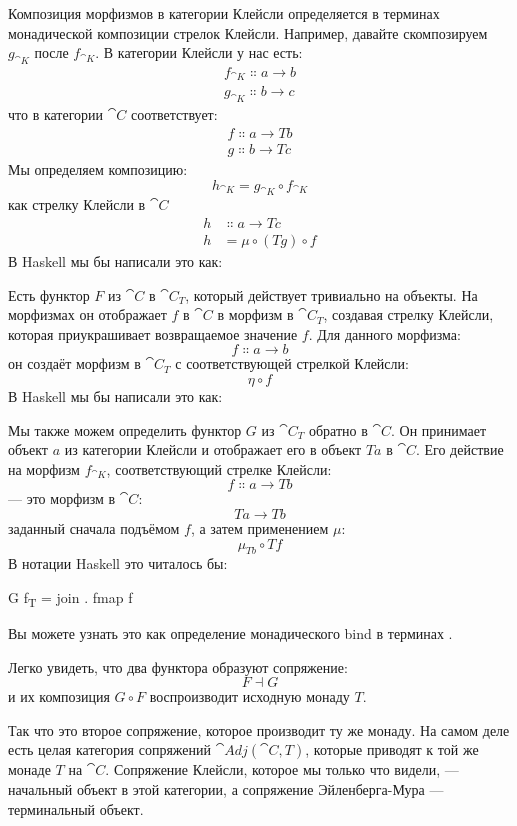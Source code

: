 Композиция морфизмов в категории Клейсли определяется в терминах
монадической композиции стрелок Клейсли. Например, давайте скомпозируем
$g_{\cat{K}}$ после $f_{\cat{K}}$. В категории Клейсли у нас есть:
\begin{gather*}
  f_{\cat{K}} \Colon a \to b \\
  g_{\cat{K}} \Colon b \to c
\end{gather*}
что в категории $\cat{C}$ соответствует:
\begin{gather*}
  f \Colon a \to T b \\
  g \Colon b \to T c
\end{gather*}
Мы определяем композицию:
\[h_{\cat{K}} = g_{\cat{K}} \circ f_{\cat{K}}\]
как стрелку Клейсли в $\cat{C}$
\begin{align*}
  h & \Colon a \to T c          \\
  h & = \mu \circ (T g) \circ f
\end{align*}
В Haskell мы бы написали это как:

Есть функтор $F$ из $\cat{C}$ в $\cat{C}_T$,
который действует тривиально на объекты. На морфизмах он отображает $f$ в
$\cat{C}$ в морфизм в $\cat{C}_T$, создавая
стрелку Клейсли, которая приукрашивает возвращаемое значение $f$. Для данного
морфизма:
\[f \Colon a \to b\]
он создаёт морфизм в $\cat{C}_T$ с
соответствующей стрелкой Клейсли:
\[\eta \circ f\]
В Haskell мы бы написали это как:

Мы также можем определить функтор $G$ из $\cat{C}_T$
обратно в $\cat{C}$. Он принимает объект $a$ из категории
Клейсли и отображает его в объект $T a$ в $\cat{C}$. Его действие
на морфизм $f_{\cat{K}}$, соответствующий стрелке Клейсли:
\[f \Colon a \to T b\]
--- это морфизм в $\cat{C}$:
\[T a \to T b\]
заданный сначала подъёмом $f$, а затем применением $\mu$:
\[\mu_{T b} \circ T f\]
В нотации Haskell это читалось бы:

\begin{snipv}
G f\textsubscript{T} = join . fmap f
\end{snipv}
Вы можете узнать это как определение монадического bind в терминах
.

Легко увидеть, что два функтора образуют сопряжение:
\[F \dashv G\]
и их композиция $G \circ F$ воспроизводит исходную монаду $T$.

Так что это второе сопряжение, которое производит ту же монаду. На самом деле
есть целая категория сопряжений $\cat{Adj}(\cat{C}, T)$, которые приводят
к той же монаде $T$ на $\cat{C}$. Сопряжение Клейсли, которое мы только что
видели, --- начальный объект в этой категории, а
сопряжение Эйленберга-Мура --- терминальный объект.

